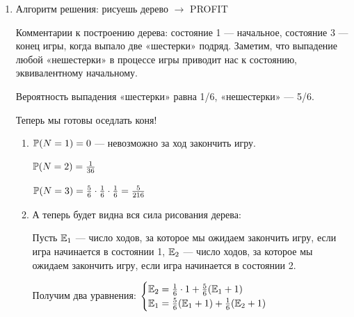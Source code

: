 \documentclass[12pt, a4paper]{article}\usepackage[]{graphicx}\usepackage[]{color}
\begin{document}
\begin{enumerate}
\item
Алгоритм решения: рисуешь дерево $\rightarrow$ PROFIT

\begin{center}


\end{center}

Комментарии к построению дерева: состояние 1 — начальное, состояние 3 — конец игры, когда выпало две «шестерки» подряд. Заметим, что выпадение любой «нешестерки» в процессе игры приводит нас к состоянию, эквивалентному начальному.

Вероятность выпадения «шестерки» равна 1/6, «нешестерки» — 5/6.

Теперь мы готовы оседлать коня!

\begin{enumerate}
\item $\P(N = 1) = 0$ — невозможно за ход закончить игру.

$\P(N = 2) = \frac{1}{36}$

$\P(N = 3) = \frac{5}{6} \cdot \frac{1}{6} \cdot \frac{1}{6} = \frac{5}{216}$

\item А теперь будет видна вся сила рисования дерева:

Пусть $\E_1$ — число ходов, за которое мы ожидаем закончить игру, если игра начинается в состоянии 1, $\E_2$ — число ходов, за которое мы ожидаем закончить игру, если игра начинается в состоянии 2.

Получим два уравнения:
$\begin{cases} \E_2 = \frac{1}{6} \cdot 1 +  \frac{5}{6} (\E_1 + 1)   \\ \E_1 =  \frac{5}{6} (\E_1 + 1) + \frac{1}{6} ( \E_2 + 1) \end{cases} $


\end{enumerate}
\end{enumerate}
\end{document}
